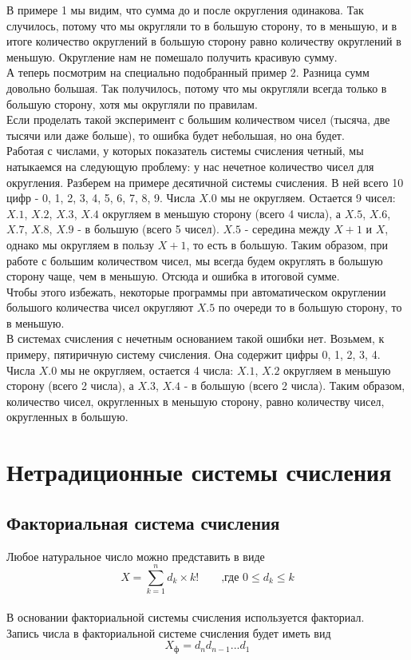 В примере 1 мы видим, что сумма до и после округления одинакова. Так случилось, потому что мы округляли то в большую сторону, то в меньшую, и в итоге количество округлений в большую сторону равно количеству округлений в меньшую. Округление нам не помешало получить красивую сумму.
\\А теперь посмотрим на специально подобранный пример 2. Разница сумм довольно большая. Так получилось, потому что мы округляли всегда только в большую сторону, хотя мы округляли по правилам.
\\Если проделать такой эксперимент с большим количеством чисел (тысяча, две тысячи или даже больше), то ошибка будет небольшая, но она будет.
\\Работая с числами, у которых показатель системы счисления четный, мы натыкаемся на следующую проблему: у нас нечетное количество чисел для округления. Разберем на примере десятичной системы счисления. В ней всего 10 цифр - 0, 1, 2, 3, 4, 5, 6, 7, 8, 9. Числа $X.0$ мы не округляем. Остается 9 чисел: $X.1$, $X.2$, $X.3$, $X.4$ округляем в меньшую сторону (всего 4 числа), а $X.5$, $X.6$, $X.7$, $X.8$, $X.9$ - в большую (всего 5 чисел). $X.5$ - середина между $X+1$ и $X$, однако мы округляем в пользу $X+1$, то есть в большую. Таким образом, при работе с большим количеством чисел, мы всегда будем округлять в большую сторону чаще, чем в меньшую. Отсюда и ошибка в итоговой сумме.
\\Чтобы этого избежать, некоторые программы при автоматическом округлении большого количества чисел округляют $X.5$ по очереди то в большую сторону, то в меньшую.
\\В системах счисления с нечетным основанием такой ошибки нет. Возьмем, к примеру, пятиричную систему счисления. Она содержит цифры 0, 1, 2, 3, 4. Числа $X.0$ мы не округляем, остается 4 числа: $X.1$, $X.2$ округляем в меньшую сторону (всего 2 числа), а $X.3$, $X.4$ - в большую (всего 2 числа). Таким образом, количество чисел, округленных в меньшую сторону, равно количеству чисел, округленных в большую.

\section{Нетрадиционные системы счисления}
\subsection{Факториальная система счисления}
Любое натуральное число можно представить в виде $$ X = \sum^{n}_{k = 1} d_{k}\times k! \qquad \mbox{,где  } 0 \leqslant d_{k} \leqslant k $$
\\В основании факториальной системы счисления используется факториал.
\\Запись числа в факториальной системе счисления будет иметь вид $$X_{\mbox{ф}} = d_{n}d_{n-1}...d_{1} $$

